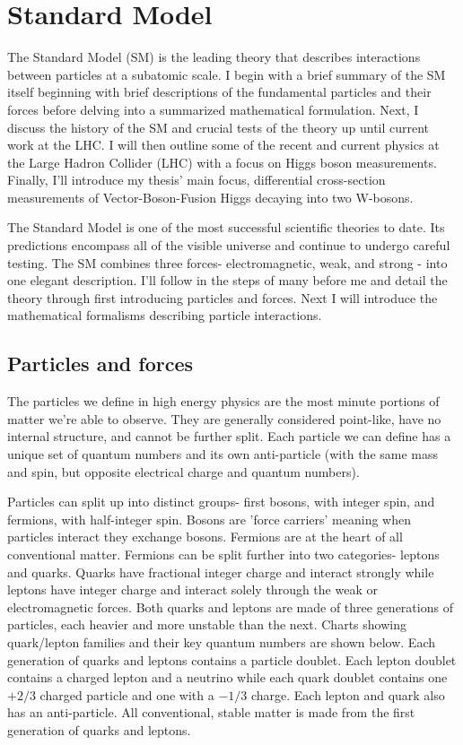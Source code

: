 \section{Standard Model}
The Standard Model (SM) is the leading theory that describes interactions between particles at a subatomic scale. I begin with a brief summary of the SM itself beginning with brief descriptions of the fundamental particles and their forces before delving into a summarized mathematical formulation. Next, I discuss the history of the SM and crucial tests of the theory up until current work at the LHC.  I will then  outline some of the recent and current physics at the Large Hadron Collider (LHC) with a focus on Higgs boson measurements. Finally, I'll introduce my thesis' main focus, differential cross-section measurements of Vector-Boson-Fusion Higgs decaying into two W-bosons.

The Standard Model is one of the most successful scientific theories to date. Its predictions encompass all of the visible universe and continue to undergo careful testing. The SM combines three forces- electromagnetic, weak, and strong - into one elegant description. I'll follow in the steps of many before me and detail the theory through first introducing particles and forces. Next I will introduce the mathematical formalisms describing particle interactions.
\subsection{Particles and forces}
 The particles we define in high energy physics are the most minute portions of matter we're able to observe. They are generally considered point-like, have no internal structure, and cannot be further split. Each particle we can define has a unique set of quantum numbers and its own anti-particle (with the same mass and spin, but opposite electrical charge and quantum numbers).

Particles can split up into distinct groups- first bosons, with integer spin, and fermions, with half-integer spin. Bosons are 'force carriers' meaning when particles interact they exchange bosons. Fermions are at the heart of all conventional matter. Fermions can be split further into two categories- leptons and quarks. Quarks have fractional integer charge and interact strongly while leptons have integer charge and interact solely through the weak or electromagnetic forces. Both quarks and leptons are made of three generations of particles, each heavier and more unstable than the next. Charts showing quark/lepton families and their key quantum numbers are shown below. Each generation of quarks and leptons contains a particle doublet. Each lepton doublet contains a charged lepton and a neutrino while each quark doublet contains one $+2/3$ charged particle and one with a $-1/3$ charge. Each lepton and quark also has an anti-particle. All conventional, stable matter is made from the first generation of quarks and leptons.


